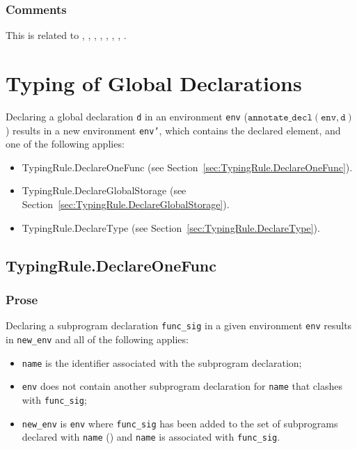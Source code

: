 \documentclass{book}
\newcommand\declaredecl[1]{\texttt{annotate\_decl}(#1)}
\newcommand\tenv[0]{\texttt{env}}
\begin{document}
\subsection{Comments}
This is related to , , , ,
, , , .

\chapter{Typing of Global Declarations}

Declaring a global declaration \texttt{d} in an environment \texttt{env} ($\declaredecl{\tenv, \texttt{d}}$)
results in a new environment \texttt{env'}, which contains the declared element, and one of the following applies:
\begin{itemize}
  \item TypingRule.DeclareOneFunc (see Section~\ref{sec:TypingRule.DeclareOneFunc}).
  \item TypingRule.DeclareGlobalStorage (see Section~\ref{sec:TypingRule.DeclareGlobalStorage}).
  \item TypingRule.DeclareType (see Section~\ref{sec:TypingRule.DeclareType}).
\end{itemize}

\section{TypingRule.DeclareOneFunc \label{sec:TypingRule.DeclareOneFunc}}
\subsection{Prose}
Declaring a subprogram declaration \texttt{func\_sig} in a given environment \texttt{env} results
in \texttt{new\_env} and all of the following applies:
\begin{itemize}
  \item \texttt{name} is the identifier associated with the subprogram declaration;
  \item \texttt{env} does not contain another subprogram declaration for \texttt{name} that clashes with \texttt{func\_sig};
  \item \texttt{new\_env} is \texttt{env} where 
  \texttt{func\_sig} has been added to the set of subprograms declared with \texttt{name} (\subprogramrenamings)
  and \texttt{name} is associated with \texttt{func\_sig}.
\end{itemize}
\end{document}
